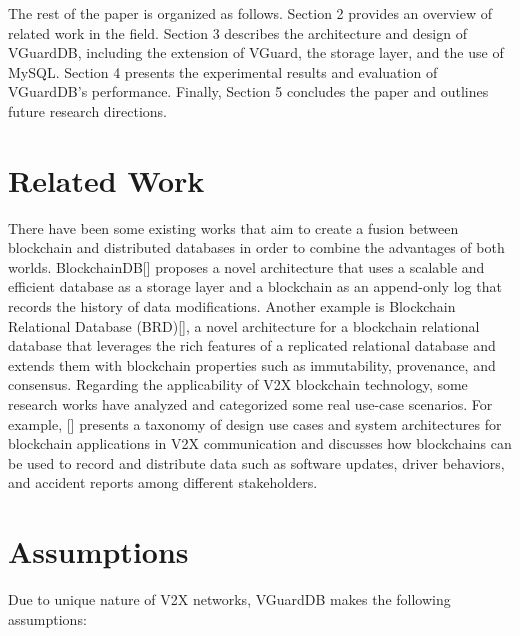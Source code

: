 The rest of the paper is organized as follows. Section 2 provides an overview of related work in the field. Section 3 describes the architecture and design of VGuardDB, including the extension of VGuard, the storage layer, and the use of MySQL. Section 4 presents the experimental results and evaluation of VGuardDB's performance. Finally, Section 5 concludes the paper and outlines future research directions.

\section{Related Work}
There have been some existing works that aim to create a fusion between blockchain and distributed databases in order to combine the advantages of both worlds. BlockchainDB[] proposes a novel architecture that uses a scalable and efficient database as a storage layer and a blockchain as an append-only log that records the history of data modifications. Another example is Blockchain Relational Database (BRD)[], a novel architecture for a blockchain relational database that leverages the rich features of a replicated relational database and extends them with blockchain properties such as immutability, provenance, and consensus.
Regarding the applicability of V2X blockchain technology, some research works have analyzed and categorized some real use-case scenarios. For example,  [] presents a taxonomy of design use cases and system architectures for blockchain applications in V2X communication and discusses how blockchains can be used to record and distribute data such as software updates, driver behaviors, and accident reports among different stakeholders. 

\section{Assumptions}
Due to unique nature of V2X networks, VGuardDB makes the following assumptions:

